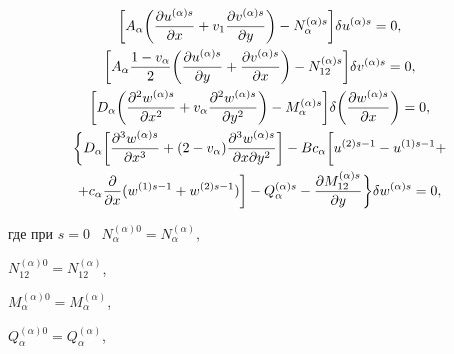 \begin{gather} 


\bigg[A_\alpha\bigg(\frac{\partial u^{(\alpha)s}}{\partial x} 


+v_1\frac{\partial v^{(\alpha)s}}{\partial y}\bigg) 


-N^{(\alpha)s}_\alpha\bigg]\delta u^{(\alpha)s}=0,\notag \\ 


% 


\bigg[A_\alpha\frac{1-v_\alpha}{2} 


\bigg(\frac{\partial u^{(\alpha)s}}{\partial y} 


+\frac{\partial v^{(\alpha)s}}{\partial x}\bigg) 


-N^{(\alpha)s}_{12}\bigg]\delta v^{(\alpha)s}=0,\notag \\ 


% 


\bigg[D_\alpha\bigg(\frac{\partial^2 w^{(\alpha)s}}{\partial x^2} 


+v_\alpha\frac{\partial^2 w^{(\alpha)s}}{\partial y^2}\bigg) 


-M^{(\alpha)s}_\alpha\bigg]\delta\bigg( 


\frac{\partial w^{(\alpha)s}}{\partial x}\bigg)=0,\\ 


% 


\bigg\{D_\alpha\bigg[\frac{\partial^3w^{(\alpha)s}}{\partial x^3} 


+(2-v_\alpha) 


\frac{\partial^3 w^{(\alpha)s}}{\partial x\partial y^2}\bigg]- 


Bc_\alpha\bigg[u^{(2)s-1}-u^{(1)s-1}+\notag \\ 


% 


+c_\alpha\frac{\partial}{\partial x}(w^{(1)s-1}+w^{(2)s-1})\bigg] 


-Q^{(\alpha)s}_\alpha- 


\frac{\partial M^{(\alpha)s}_{12}}{\partial y}\bigg\} 


\delta w^{(\alpha)s}=0,\notag 


\end{gather} 


где при $s=0$ \ $N^{(\alpha)0}_\alpha=N^{(\alpha)}_\alpha$, 


$N^{(\alpha)0}_{12}=N^{(\alpha)}_{12}$, 


$M^{(\alpha)0}_\alpha=M^{(\alpha)}_\alpha$, 


$Q^{(\alpha)0}_\alpha=Q^{(\alpha)}_\alpha$, 


